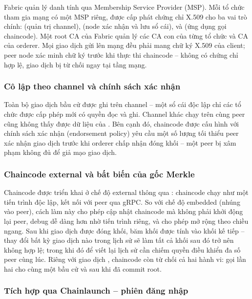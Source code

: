 Fabric quản lý danh tính qua Membership Service Provider (MSP). Mỗi tổ chức tham gia mạng có một MSP riêng, được cấp phát chứng chỉ X.509 cho ba vai trò chính:  (quản trị channel),  (node xác nhận và lưu sổ cái), và  (ứng dụng gọi chaincode). Một root CA của Fabric quản lý các CA con của từng tổ chức và CA của orderer. Mọi giao dịch gửi lên mạng đều phải mang chữ ký X.509 của client; peer node xác minh chữ ký trước khi thực thi chaincode -- không có chứng chỉ hợp lệ, giao dịch bị từ chối ngay tại tầng mạng.

\subsubsection{Cô lập theo channel và chính sách xác nhận}

Toàn bộ giao dịch bầu cử được ghi trên channel  -- một sổ cái độc lập chỉ các tổ chức được cấp phép mới có quyền đọc và ghi. Channel khác chạy trên cùng peer cũng không thấy được dữ liệu của . Bên cạnh đó, chaincode  được cấu hình với chính sách xác nhận (endorsement policy) yêu cầu một số lượng tối thiểu peer xác nhận giao dịch trước khi orderer chấp nhận đóng khối -- một peer bị xâm phạm không đủ để giả mạo giao dịch.

\subsubsection{Chaincode external và bất biến của gốc Merkle}

Chaincode được triển khai ở chế độ external thông qua : chaincode chạy như một tiến trình độc lập, kết nối với peer qua gRPC. So với chế độ embedded (nhúng vào peer), cách làm này cho phép cập nhật chaincode mà không phải khởi động lại peer, debug dễ dàng hơn nhờ tiến trình riêng, và cho phép mở rộng theo chiều ngang. Sau khi giao dịch  được đóng khối, băm khối được tính vào khối kế tiếp -- thay đổi bất kỳ giao dịch nào trong lịch sử sẽ làm tất cả khối sau đó trở nên không hợp lệ; trong khi đó để viết lại lịch sử cần chiếm quyền điều khiển đa số peer cùng lúc. Riêng với giao dịch , chaincode còn từ chối cả hai hành vi: gọi  lần hai cho cùng một bầu cử và  sau khi đã commit root.

\subsubsection{Tích hợp qua Chainlaunch -- phiên đăng nhập}


